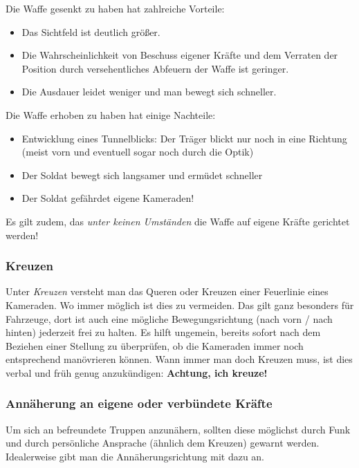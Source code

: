 	Die Waffe gesenkt zu haben hat zahlreiche Vorteile:
	\begin{itemize}
		\item Das Sichtfeld ist deutlich größer.
		\item Die Wahrscheinlichkeit von Beschuss eigener Kräfte und dem Verraten der Position durch versehentliches Abfeuern der Waffe ist geringer.
		\item Die Ausdauer leidet weniger und man bewegt sich schneller.
	\end{itemize}
	Die Waffe erhoben zu haben hat einige Nachteile:
	\begin{itemize}
		\item Entwicklung eines Tunnelblicks: Der Träger blickt nur noch in eine Richtung (meist vorn und eventuell sogar noch durch die Optik)
		\item Der Soldat bewegt sich langsamer und ermüdet schneller
		\item Der Soldat gefährdet eigene Kameraden!
	\end{itemize}
	Es gilt zudem, das \textit{unter keinen Umständen} die Waffe auf eigene Kräfte gerichtet werden!

	\subsubsection{Kreuzen}
		Unter \textit{Kreuzen} versteht man das Queren oder Kreuzen einer Feuerlinie eines Kameraden. Wo immer möglich ist dies zu vermeiden. Das gilt ganz besonders für Fahrzeuge, dort ist auch eine mögliche Bewegungsrichtung (nach vorn / nach hinten) jederzeit frei zu halten. Es hilft ungemein, bereits sofort nach dem Beziehen einer Stellung zu überprüfen, ob die Kameraden immer noch entsprechend manövrieren können. Wann immer man doch Kreuzen muss, ist dies verbal und früh genug anzukündigen: \textbf{\glqq Achtung, ich kreuze!\grqq}

	\subsubsection{Annäherung an eigene oder verbündete Kräfte}
		Um sich an befreundete Truppen anzunähern, sollten diese möglichst durch Funk und durch persönliche Ansprache (ähnlich dem Kreuzen) gewarnt werden. Idealerweise gibt man die Annäherungsrichtung mit dazu an.

